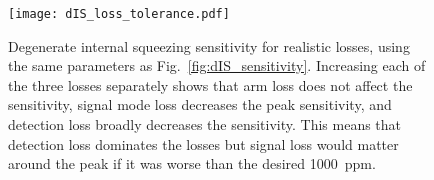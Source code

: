 \begin{figure}
	\centering
	\texttt{[image: dIS\_loss\_tolerance.pdf]}
	\caption{ Degenerate internal squeezing sensitivity for realistic losses, using the same parameters as Fig.~\ref{fig:dIS_sensitivity}. Increasing each of the three losses separately shows that arm loss does not affect the sensitivity, signal mode loss decreases the peak sensitivity, and detection loss broadly decreases the sensitivity. This means that detection loss dominates the losses but signal loss would matter around the peak if it was worse than the desired 1000~ppm.}
	\label{fig:dIS_loss_tolerance}
\end{figure}


